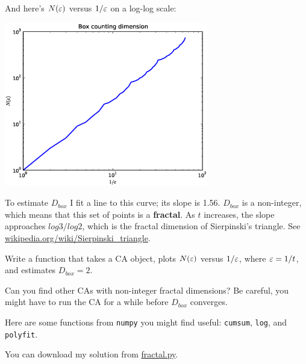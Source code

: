 \documentclass[10pt]{book}
\begin{document}
And here's $N(\varepsilon)$ versus $1/\varepsilon$ on a log-log scale:

\beforefig
\centerline{\includegraphics[width=3.5in]{figs/fractal_dim18.64.eps}}
\afterfig

To estimate $D_{box}$ I fit a line to this curve; its slope is 1.56.
$D_{box}$ is a non-integer, which means that this set of
points is a {\bf fractal}.  As $t$ increases, the slope approaches
$log 3 / log 2$, which is the fractal dimension of Sierpinski's
triangle.  See \url{wikipedia.org/wiki/Sierpinski_triangle}.

\begin{ex}

Write a function that takes a CA object, plots $N(\varepsilon)$ versus
$1/\varepsilon$, where $\varepsilon = 1/t$, and estimates $D_{box} = 2$.

Can you find other CAs with non-integer fractal dimensions?  Be
careful, you might have to run the CA for a while before
$D_{box}$ converges.

Here are some functions from {\tt numpy} you might find useful:
{\tt cumsum}, {\tt log}, and {\tt polyfit}.

You can download my solution from \url{fractal.py}.

\end{ex}
\end{document}
